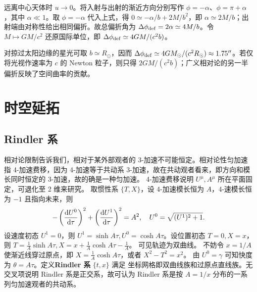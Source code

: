 远离中心天体时 $u\to0$。将入射与出射的渐近方向分别写作 $\phi=-\alpha$、$\phi=\pi+\alpha$，其中 $\alpha\ll1$。取 $\phi=-\alpha$ 代入上式，得 $0\simeq-\alpha/b+2M/b^2$，即 $\alpha\simeq2M/b$；出射端由对称性给出相同偏折。故总偏折角为 $\Delta\phi_{\rm def}=2\alpha\simeq4M/b$。令 $M\mapsto GM/c^2$ 还原国际单位，即 $\Delta\phi_{\rm def}\simeq4GM/(c^2b)$。

对掠过太阳边缘的星光可取 $b\simeq R_\odot$，因而 $\Delta\phi_{\rm def}\simeq4GM_\odot/(c^2R_\odot)\approx1.75''$。若仅将光视作速率为 $c$ 的 Newton 粒子，则只得 $2GM/(c^2b)$；广义相对论的另一半偏折反映了空间曲率的贡献。


\section{时空延拓}

\subsection{Rindler 系}

相对论限制告诉我们，相对于某外部观者的 3-加速不可能恒定。相对论性匀加速指 4-加速费移，因为 4-加速等于共动系 3-加速，故在共动观者看来，即方向和模长同时恒定的 3-加速，故的确是一种匀加速。
4-加速费移说明 $U^\mu,A^\mu$ 所在平面固定，可退化至 2 维来研究。
取惯性系 $\{T,X\}$，设 4-加速模长恒为 $A$，4-速模长恒为 $-1$ 且指向未来，则
\[-\left(\dv{U^0}{\tau}\right)^2+\left(\dv{U^1}{\tau}\right)^2=A^2,\quad U^0=\sqrt{(U^1)^2+1}.\]
设速度初态 $U^1=0$，则 $U^1=\sinh A\tau,U^0=\cosh A\tau$。设位置初态 $T=0,X=x$，则 $T=\frac 1A\sinh A\tau,X=x+\frac 1A\cosh A\tau-\frac 1A$。
可见轨迹为双曲线。
不妨令 $x=1/A$ 使渐近线穿过原点，即 $X=\frac 1A\cosh A\tau$，或者 $X^2-T^2=x^2$。
由 $U^0=\gamma$ 可知快度为 $\theta=A\tau$。定义\textbf{Rindler 系} $\{t,x\}$ 满足
坐标网格即双曲线族和过原点直线族。无交叉项说明 Rindler 系是正交系，故可认为 Rindler 系是按 $A=1/x$ 分布的一系列匀加速观者的共动系。

